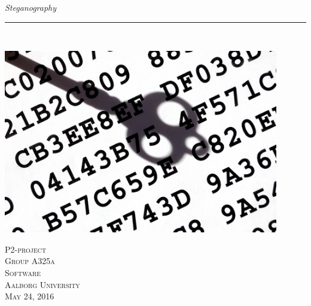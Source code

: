 \thispagestyle{empty}
\begin{flushright}
\vspace{3cm}

\phantom{hul}

\phantom{hul}

\phantom{hul}

\textsl{\Huge Steganography} \\ \vspace{1cm}

\rule{13cm}{3mm} \\ \vspace{1.5cm}
\vspace{1cm}

\includegraphics[width=0.9\textwidth]{images/frontpage.jpg}

\vspace{2cm} 
\textsc{\Large P2-project \\
Group A325a \\
Software\\
Aalborg University\\
May 24, 2016\\}
\end{flushright}
